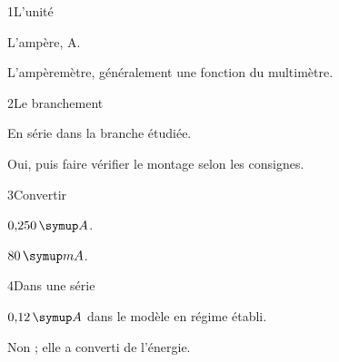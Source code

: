 \par\noindent\begin{minipage}{\linewidth}
\begin{corrige}{1}{L’unité}
\begin{questions}
\item L’ampère, A.
\item L’ampèremètre, généralement une fonction du multimètre.
\end{questions}
\end{corrige}
\end{minipage}
\par\noindent\begin{minipage}{\linewidth}
\begin{corrige}{2}{Le branchement}
\begin{questions}
\item En série dans la branche étudiée.
\item Oui, puis faire vérifier le montage selon les consignes.
\end{questions}
\end{corrige}
\end{minipage}
\par\noindent\begin{minipage}{\linewidth}
\begin{corrige}{3}{Convertir}
\begin{questions}
\item $0{,}250\unite A$.
\item $80\unite{mA}$.
\end{questions}
\end{corrige}
\end{minipage}
\par\noindent\begin{minipage}{\linewidth}
\begin{corrige}{4}{Dans une série}
\begin{questions}
\item $0{,}12\unite A$ dans le modèle en régime établi.
\item Non ; elle a converti de l’énergie.
\end{questions}
\end{corrige}
\end{minipage}
